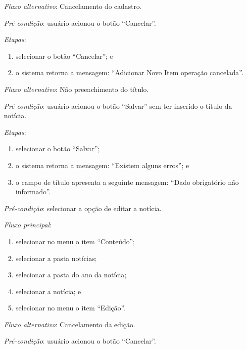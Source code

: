 \noindent \textit{Fluxo alternativo}: Cancelamento do cadastro.

\noindent \textit{Pré-condição}:  usuário acionou o botão ``Cancelar''.

\noindent \textit{Etapas}:

\begin{enumerate}
    \item selecionar o botão ``Cancelar''; e
    \item o sistema retorna a mensagem: ``Adicionar Novo Item operação cancelada''.
\end{enumerate}

\noindent \textit{Fluxo alternativo}: Não preenchimento do título.

\noindent \textit{Pré-condição}: usuário acionou o botão ``Salvar'' sem ter inserido o título da notícia.

\noindent \textit{Etapas}:

\begin{enumerate}
    \item selecionar o botão ``Salvar'';
    \item o sistema retorna a mensagem: ``Existem alguns erros''; e
    \item o campo de título apresenta a seguinte mensagem: ``Dado obrigatório não informado''.
\end{enumerate}




\vspace{0.7cm}

\noindent \textit{Pré-condição}: selecionar a opção de editar a notícia.

\noindent \textit{Fluxo principal}:

\begin{enumerate}
    \item selecionar no menu o item ``Conteúdo'';
    \item selecionar a pasta notícias;
    \item selecionar a pasta do ano da notícia;
    \item selecionar a notícia; e
    \item selecionar no menu o item ``Edição''.
\end{enumerate}

\noindent \textit{Fluxo alternativo}: Cancelamento da edição.

\noindent \textit{Pré-condição}: usuário acionou o botão ``Cancelar''.

